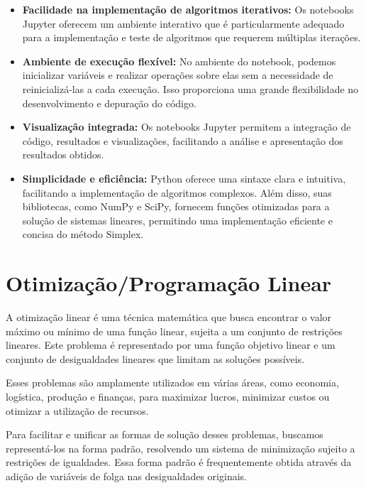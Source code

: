 \documentclass{article}
\begin{document}
\begin{itemize}
    \item \textbf{Facilidade na implementação de algoritmos iterativos:} Os notebooks Jupyter oferecem um ambiente interativo que é particularmente adequado para a implementação e teste de algoritmos que requerem múltiplas iterações.
    
    \item \textbf{Ambiente de execução flexível:} No ambiente do notebook, podemos inicializar variáveis e realizar operações sobre elas sem a necessidade de reinicializá-las a cada execução. Isso proporciona uma grande flexibilidade no desenvolvimento e depuração do código.
    
    \item \textbf{Visualização integrada:} Os notebooks Jupyter permitem a integração de código, resultados e visualizações, facilitando a análise e apresentação dos resultados obtidos.
    
    \item \textbf{Simplicidade e eficiência:} Python oferece uma sintaxe clara e intuitiva, facilitando a implementação de algoritmos complexos. Além disso, suas bibliotecas, como NumPy e SciPy, fornecem funções otimizadas para a solução de sistemas lineares, permitindo uma implementação eficiente e concisa do método Simplex.
\end{itemize}


\section{Otimização/Programação Linear}

A otimização linear é uma técnica matemática que busca encontrar o valor máximo ou mínimo de uma função linear, sujeita a um conjunto de restrições lineares. Este problema é representado por uma função objetivo linear e um conjunto de desigualdades lineares que limitam as soluções possíveis.

Esses problemas são amplamente utilizados em várias áreas, como economia, logística, produção e finanças, para maximizar lucros, minimizar custos ou otimizar a utilização de recursos.


Para facilitar e unificar as formas de solução desses problemas, buscamos representá-los na forma padrão, resolvendo um sistema de minimização sujeito a restrições de igualdades. Essa forma padrão é frequentemente obtida através da adição de variáveis de folga nas desigualdades originais.
\end{document}
